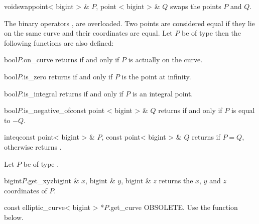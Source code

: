 \begin{fcode}{void}{swap}{point< bigint > & $P$, point < bigint > & $Q$}
  swaps the points $P$ and $Q$.
\end{fcode}



\COMP

The binary operators \code{==}, \code{!=} are overloaded.  Two points are considered equal if
they lie on the same curve and their coordinates are equal.  Let $P$ be of type  then the following functions are also defined:

\begin{cfcode}{bool}{$P$.on_curve}{}
  returns \TRUE if and only if $P$ is actually on the curve.
\end{cfcode}

\begin{cfcode}{bool}{$P$.is_zero}{}
  returns \TRUE if and only if $P$ is the point at infinity.
\end{cfcode}

\begin{cfcode}{bool}{$P$.is_integral}{}
  returns \TRUE if and only if $P$ is an integral point.
\end{cfcode}

\begin{cfcode}{bool}{$P$.is_negative_of}{const point < bigint > & $Q$}
  returns \TRUE if and only if $P$ is equal to $-Q$.
\end{cfcode}

\begin{fcode}{int}{eq}{const point< bigint > & $P$, const point< bigint > & $Q$}
  returns \TRUE if $P = Q$, otherwise returns \FALSE.
\end{fcode}



\ACCS

Let $P$ be of type .

\begin{cfcode}{bigint}{$P$.get_xyz}{bigint & $x$, bigint & $y$, bigint & $z$}
  returns the $x$, $y$ and $z$ coordinates of $P$.
\end{cfcode}

\begin{cfcode}{const elliptic_curve< bigint > *}{$P$.get_curve}{}
  OBSOLETE.  Use the function below.
\end{cfcode}

